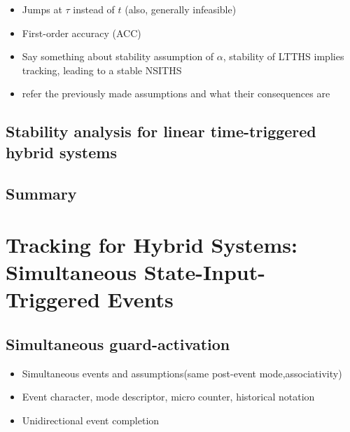 \documentclass[../DC2017114Bouma.tex]{subfiles}
\begin{document}
\begin{itemize}
\item Jumps at $\tau$ instead of $t$ (also, generally infeasible)
\item First-order accuracy (ACC)
\item Say something about stability assumption of $\alpha$, stability of LTTHS implies tracking, leading to a stable NSITHS
\item refer the previously made assumptions and what their consequences are
\end{itemize}
\section{Stability analysis for linear time-triggered hybrid systems}

\section{Summary}

\cleartooddpage
\chapter{Tracking for Hybrid Systems: Simultaneous State-Input-Triggered Events}\label{ch:simult}
\cite{Rijnen2018}
\section{Simultaneous guard-activation}
\begin{itemize}
\item Simultaneous events and assumptions(same post-event mode,associativity)
\item Event character, mode descriptor, micro counter, historical notation
\item Unidirectional event completion
\end{itemize}
%
%
%
%
%
%
%
%
%
\end{document}
